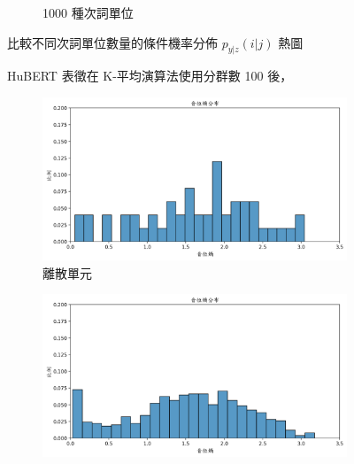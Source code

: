 {{{{\begin{figure}
\begin{subfigure}{\textwidth}
                 \caption{1000 種次詞單位}
                 \label{fig:hub-u100-ap1000-givenunit-byphn}
             \end{subfigure}

             \caption{HuBERT 表徵在 K-平均演算法使用分群數 100 後，}
             比較不同次詞單位數量的條件機率分佈 $p_{y|z}(i | j)$ 熱圖
             \label{fig:hub-u100-comparisons}
        \end{figure}
    }
}

{
    {
        \newcommand{\tempwidth}[0]{0.7\linewidth}
        \begin{figure}
             \centering
             \begin{subfigure}{\textwidth}
                 \centering
                 \includegraphics[width=\tempwidth]{feasiblefigs/ch4figs/hub-u050-ap0000-phnent-hist.png}
                 \caption{離散單元}
                 \label{fig:hub-u050-ap0000-phnent-hist}
             \end{subfigure}
             \vfill
             \begin{subfigure}{\textwidth}
                 \centering
                 \includegraphics[width=\tempwidth]{feasiblefigs/ch4figs/hub-u050-ap0500-phnent-hist.png}

\end{subfigure}
\end{figure}}}}}
